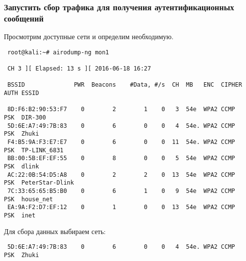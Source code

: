 \documentclass[10pt,a4paper,titlepage]{article}
\begin{document}
\subsubsection{Запустить сбор трафика для получения аутентификационных сообщений}
Просмотрим доступные сети и определим необходимую.
\begin{verbatim}
 root@kali:~# airodump-ng mon1

 CH 3 ][ Elapsed: 13 s ][ 2016-06-18 16:27                                         
                                                                                                                      
 BSSID              PWR  Beacons    #Data, #/s  CH  MB   ENC  CIPHER AUTH ESSID                                       
                                                                                                                      
 8D:F6:B2:90:53:F7    0        2        1    0   3  54e  WPA2 CCMP   PSK  DIR-300                                       
 5D:6E:A7:49:7B:83    0        6        0    0   4  54e. WPA2 CCMP   PSK  Zhuki
 F4:B5:9A:F3:E7:E7    0        6        0    0  11  54e. WPA2 CCMP   PSK  TP-LINK_6831                                     
 BB:00:5B:EF:EF:55    0        8        0    0   5  54e  WPA2 CCMP   PSK  dlink                                          
 AC:22:0B:54:D5:A8    0        2        2    0  13  54e  WPA2 CCMP   PSK  PeterStar-Dlink                                         
 7C:33:65:65:B5:B0    0        6        1    0   9  54e  WPA2 CCMP   PSK  house_net                                    
 EA:9A:F2:D7:EF:12    0        1        0    0  13  54e  WPA2 CCMP   PSK  inet 
 \end{verbatim}
 
Для сбора данных выбираем сеть:
\begin{verbatim}
 5D:6E:A7:49:7B:83    0        6        0    0   4  54e. WPA2 CCMP   PSK  Zhuki                                       
 \end{verbatim}
 
\end{document}
